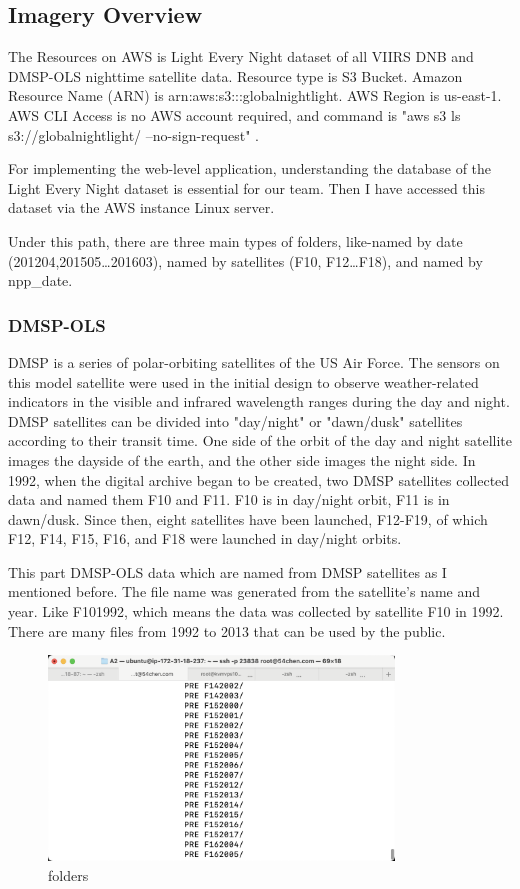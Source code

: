 \documentclass[conference]{IEEEtran}
\begin{document}
\subsection{Imagery Overview}
The Resources on AWS is Light Every Night dataset of all VIIRS DNB and DMSP-OLS nighttime satellite data. Resource type is S3 Bucket. 
Amazon Resource Name (ARN) is arn:aws:s3:::globalnightlight. AWS Region is us-east-1. AWS CLI Access is no AWS account required, and 
command is "aws s3 ls s3://globalnightlight/ --no-sign-request" \cite{WorldBan13:online}.

For implementing the web-level application, understanding the database of the Light Every Night dataset is essential 
for our team. Then I have accessed this dataset via the AWS instance Linux server. 

Under this path, there are three main types of folders, like-named by date (201204,201505…201603), named by satellites 
(F10, F12…F18), and named by npp\_date.

\subsubsection{DMSP-OLS}

DMSP is a series of polar-orbiting satellites of the US Air Force. The sensors on this model satellite were used in the 
initial design to observe weather-related indicators in the visible and infrared wavelength ranges during the day and night. 
DMSP satellites can be divided into "day/night" or "dawn/dusk" satellites according to their transit time. One side of the 
orbit of the day and night satellite images the dayside of the earth, and the other side images the night side. In 1992, when 
the digital archive began to be created, two DMSP satellites collected data and named them F10 and F11. F10 is in day/night 
orbit, F11 is in dawn/dusk. Since then, eight satellites have been launched, F12-F19, of which F12, F14, F15, F16, and F18 
were launched in day/night orbits.

This part DMSP-OLS data which are named from DMSP satellites as I mentioned before. The file name was generated from the 
satellite's name and year. Like F101992, which means the data was collected by satellite F10 in 1992. There are many files 
from 1992 to 2013 that can be used by the public.

\begin{figure}[htbp]
    \centerline{\includegraphics[width=260pt]{images/2.png}}
    \caption{folders}
    \label{folders}
\end{figure}
\end{document}
